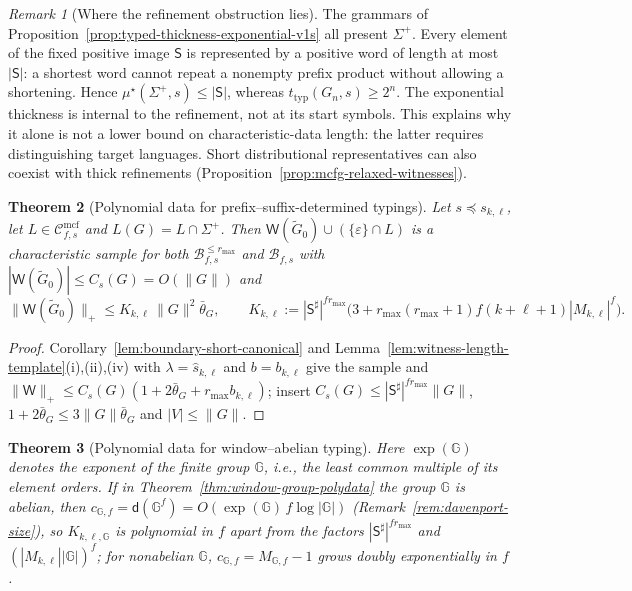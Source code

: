 \documentclass[11pt]{article}
\numberwithin{equation}{section}
\theoremstyle{plain}
\newtheorem{theorem}{Theorem}[section]
\theoremstyle{definition}
\theoremstyle{remark}
\newtheorem{remark}[theorem]{Remark}
\newcommand{\Wit}{\mathsf{W}}
\newcommand{\Cmcf}[2]{\mathcal{C}^{\mathrm{mcf}}_{#1,#2}}
\newcommand{\eps}{\varepsilon}
\theoremstyle{plain}
\begin{document}
\begin{remark}[Where the refinement obstruction lies]
\label{rem:refinement-vs-data}
The grammars of Proposition~\ref{prop:typed-thickness-exponential-v1s}
all present $\Sigma^+$. Every element of the fixed positive image
$\mathsf S$ is represented by a positive word of length at most
$|\mathsf S|$: a shortest word cannot repeat a nonempty prefix product
without allowing a shortening. Hence
$\mu^\star(\Sigma^+,s)\le|\mathsf S|$, whereas
$t_{\mathrm{typ}}(G_n,s)\ge2^n$. The exponential thickness is internal
to the refinement, not at its start symbols. This explains why it
alone is not a lower bound on characteristic-data length: the latter
requires distinguishing target languages. Short distributional
representatives can also coexist with thick refinements
(Proposition~\ref{prop:mcfg-relaxed-witnesses}).
\end{remark}

\begin{theorem}[Polynomial data for prefix--suffix-determined typings]
\label{thm:boundary-polydata}
Let $s\preceq s_{k,\ell}$, let $L\in\Cmcf{f}{s}$ and $L(G)=L\cap\Sigma^+$.  Then
$\Wit(\widetilde G_0)\cup(\{\eps\}\cap L)$ is a characteristic sample for both
$\mathcal B^{\le r_{\max}}_{f,s}$ and $\mathcal B_{f,s}$ with
$|\Wit(\widetilde G_0)|\le C_s(G)=O(\|G\|)$ and
\[
 \|\Wit(\widetilde G_0)\|_+\le K_{k,\ell}\,\|G\|^2\bar\theta_G,\qquad
 K_{k,\ell}:=|\mathsf S^\sharp|^{fr_{\max}}
   \bigl(3+r_{\max}(r_{\max}+1)f(k+\ell+1)|M_{k,\ell}|^f\bigr).
\]
\end{theorem}

\begin{proof}
Corollary~\ref{lem:boundary-short-canonical} and
Lemma~\ref{lem:witness-length-template}(i),(ii),(iv) with
$\lambda=\widehat s_{k,\ell}$ and $b=b_{k,\ell}$ give the sample and
$\|\Wit\|_+\le C_s(G)(1+2\bar\theta_G+r_{\max}b_{k,\ell})$; insert
$C_s(G)\le|\mathsf S^\sharp|^{fr_{\max}}\|G\|$, $1+2\bar\theta_G\le3\|G\|\bar\theta_G$ and
$|V|\le\|G\|$.
\end{proof}

\begin{theorem}[Polynomial data for window--abelian typing]
\label{thm:window-abelian-polydata}
Here $\exp({\mathbb G})$ denotes the exponent of the finite group ${\mathbb G}$, i.e.,
the least common multiple of its element orders.  If in
Theorem~\ref{thm:window-group-polydata} the group ${\mathbb G}$ is abelian, then
$c_{{\mathbb G},f}=\mathsf d({\mathbb G}^f)=O(\exp({\mathbb G})\,f\log|{\mathbb G}|)$
(Remark~\ref{rem:davenport-size}), so $K_{k,\ell,{\mathbb G}}$ is polynomial in $f$ apart from
the factors $|\mathsf S^\sharp|^{fr_{\max}}$ and $(|M_{k,\ell}||{\mathbb G}|)^f$; for
nonabelian ${\mathbb G}$, $c_{{\mathbb G},f}=M_{{\mathbb G},f}-1$ grows doubly exponentially in $f$.
\end{theorem}
\end{document}

